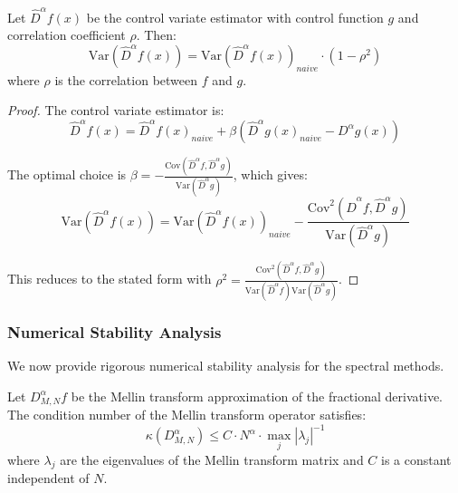 \begin{theorem}
Let $\hat{D}^{\alpha}f(x)$ be the control variate estimator with control function $g$ and correlation coefficient $\rho$. Then:
\begin{equation}
\text{Var}(\hat{D}^{\alpha}f(x)) = \text{Var}(\hat{D}^{\alpha}f(x))_{naive} \cdot (1 - \rho^2)
\end{equation}
where $\rho$ is the correlation between $f$ and $g$.
\end{theorem}

\begin{proof}
The control variate estimator is:
\begin{equation}
\hat{D}^{\alpha}f(x) = \hat{D}^{\alpha}f(x)_{naive} + \beta(\hat{D}^{\alpha}g(x)_{naive} - D^{\alpha}g(x))
\end{equation}

The optimal choice is $\beta = -\frac{\text{Cov}(\hat{D}^{\alpha}f, \hat{D}^{\alpha}g)}{\text{Var}(\hat{D}^{\alpha}g)}$, which gives:
\begin{equation}
\text{Var}(\hat{D}^{\alpha}f(x)) = \text{Var}(\hat{D}^{\alpha}f(x))_{naive} - \frac{\text{Cov}^2(\hat{D}^{\alpha}f, \hat{D}^{\alpha}g)}{\text{Var}(\hat{D}^{\alpha}g)}
\end{equation}

This reduces to the stated form with $\rho^2 = \frac{\text{Cov}^2(\hat{D}^{\alpha}f, \hat{D}^{\alpha}g)}{\text{Var}(\hat{D}^{\alpha}f)\text{Var}(\hat{D}^{\alpha}g)}$.
\end{proof}

\subsubsection{Numerical Stability Analysis}

We now provide rigorous numerical stability analysis for the spectral methods.

\begin{theorem}
Let $D^{\alpha}_{M,N} f$ be the Mellin transform approximation of the fractional derivative. The condition number of the Mellin transform operator satisfies:
\begin{equation}
\kappa(D^{\alpha}_{M,N}) \leq C \cdot N^{\alpha} \cdot \max_{j} |\lambda_j|^{-1}
\end{equation}
where $\lambda_j$ are the eigenvalues of the Mellin transform matrix and $C$ is a constant independent of $N$.
\end{theorem}

